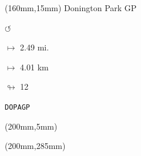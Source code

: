 \begin{textblock*}{40mm}(160mm,15mm)%
Donington Park GP
\par \Huge$\circlearrowleft$
\Large
\par$\mapsto$ 2.49 mi.
\par$\mapsto$ 4.01 km
\par$\looparrowright$ 12
\par\hfill\tiny\tt DOPAGP\\
\end{textblock*}
\begin{textblock*}{20mm}(200mm,5mm)%
\fbox{\thepage}
\end{textblock*}
\begin{textblock*}{20mm}(200mm,285mm)%
\fbox{\thepage}
\end{textblock*}
\null\newpage

